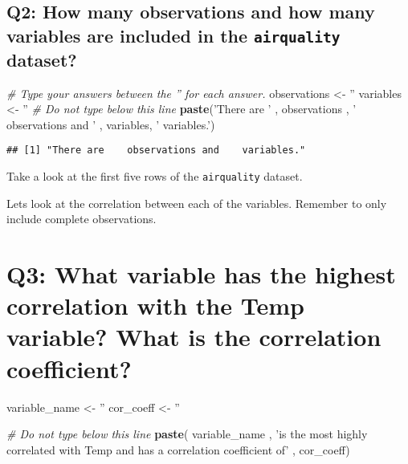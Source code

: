 \documentclass[]{book}
\newenvironment{Shaded}{\begin{snugshade}}{\end{snugshade}}
\newcommand{\KeywordTok}[1]{\textcolor[rgb]{0.13,0.29,0.53}{\textbf{#1}}}
\newcommand{\StringTok}[1]{\textcolor[rgb]{0.31,0.60,0.02}{#1}}
\newcommand{\CommentTok}[1]{\textcolor[rgb]{0.56,0.35,0.01}{\textit{#1}}}
\newcommand{\NormalTok}[1]{#1}
\begin{document}
\subsection{\texorpdfstring{Q2: How many observations and how many
variables are included in the \texttt{airquality}
dataset?}{Q2: How many observations and how many variables are included in the airquality dataset?}}\label{q2-how-many-observations-and-how-many-variables-are-included-in-the-airquality-dataset}

\begin{Shaded}
\begin{Highlighting}[]
\CommentTok{# Type your answers between the '' for each answer.}
\NormalTok{observations <-}\StringTok{ ''}
\NormalTok{variables <-}\StringTok{ ''}
\CommentTok{# Do not type below this line}
\KeywordTok{paste}\NormalTok{(}\StringTok{'There are '}\NormalTok{ , observations , }\StringTok{' observations and '}\NormalTok{ , variables, }\StringTok{' variables.'}\NormalTok{)}
\end{Highlighting}
\end{Shaded}

\begin{verbatim}
## [1] "There are    observations and    variables."
\end{verbatim}

Take a look at the first five rows of the \texttt{airquality} dataset.

Lets look at the correlation between each of the variables. Remember to
only include complete observations.

\section{Q3: What variable has the highest correlation with the Temp
variable? What is the correlation
coefficient?}\label{q3-what-variable-has-the-highest-correlation-with-the-temp-variable-what-is-the-correlation-coefficient}

\begin{Shaded}
\begin{Highlighting}[]
\NormalTok{variable_name <-}\StringTok{ ''}
\NormalTok{cor_coeff <-}\StringTok{ ''}

\CommentTok{# Do not type below this line}
\KeywordTok{paste}\NormalTok{( variable_name , }\StringTok{'is the most highly correlated with Temp and has a correlation coefficient of'}\NormalTok{ , cor_coeff)}
\end{Highlighting}
\end{Shaded}
\end{document}
